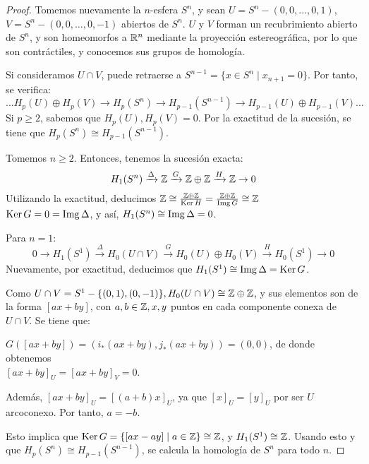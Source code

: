 \begin{proof}
  Tomemos nuevamente la $n$-esfera $S^n$, y sean $U = S^n - (0, 0, \dots, 0, 1)$, $V = S^n - (0, 0, \dots, 0, -1)$
  abiertos de $S^n$. $U$ y $V$ forman un recubrimiento abierto de $S^n$, y son homeomorfos a $\mathbb{R}^n$ mediante
  la proyección estereográfica, por lo que son contráctiles, y conocemos sus grupos de homología.

  Si consideramos $U \cap V$, puede retraerse a $S^{n-1} = \{x \in S^n \mid x_{n+1} = 0\}$. Por tanto, se verifica:
  \[ \dots H_p(U) \oplus H_p(V) \to H_p(S^n) \to H_{p-1}(S^{n-1}) \to H_{p-1}(U) \oplus H_{p-1}(V) \dots \]
  Si $p \geq 2$, sabemos que $H_p(U), H_p(V) = 0$. Por la exactitud de la sucesión, se tiene que $H_p(S^n) \cong H_{p-1}(S^{n-1})$.

  Tomemos $n \geq 2$. Entonces, tenemos la sucesión exacta:
  \[H_1(S^n) \xrightarrow{\Delta} \mathbb{Z} \xrightarrow{G} \mathbb{Z} \oplus \mathbb{Z} \xrightarrow{H} \mathbb{Z} \to 0\]
  Utilizando la exactitud, deducimos $\mathbb{Z} \cong \frac{\mathbb{Z} \oplus \mathbb{Z}}{\operatorname{Ker} H} = \frac{\mathbb{Z} \oplus \mathbb{Z}}{\operatorname{Img} G} \cong \mathbb{Z}$ \\
  $\operatorname{Ker} G = 0 = \operatorname{Img} \Delta$, y así, $H_1(S^n) \cong \operatorname{Img} \Delta = 0$.

  Para $n = 1$:
  \[ 0 \to H_1(S^1) \xrightarrow{\Delta} H_0(U \cap V) \xrightarrow{G} H_0(U) \oplus H_0(V) \xrightarrow{H} H_0(S^1) \to 0 \]
  Nuevamente, por exactitud, deducimos que $H_1(S^1) \cong \operatorname{Img} \Delta = \operatorname{Ker} G$.

  Como $U \cap V = S^1 - \{(0, 1), (0, -1)\}, H_0(U \cap V) \cong \mathbb{Z} \oplus \mathbb{Z}$, y sus elementos son de la forma
  $[ax + by]$, con $a,b \in \mathbb{Z}, x, y$ puntos en cada componente conexa de $U \cap V$. Se tiene que:

  $G([ax + by]) = (i_*(ax + by), j_*(ax + by)) = (0, 0)$, de donde obtenemos \\
  $[ax + by]_U = [ax + by]_V = 0$.

  Además, $[ax + by]_U = [(a+b) x]_U$, ya que $[x]_U = [y]_U$ por ser $U$ arcoconexo. Por tanto, $a = -b$.

  Esto implica que $\operatorname{Ker} G = \{[ax - ay] \mid a \in \mathbb{Z}\} \cong \mathbb{Z}$, y $H_1(S^1) \cong \mathbb{Z}$. Usando esto y que
  $H_p(S^n) \cong H_{p-1}(S^{n-1})$, se calcula la homología de $S^n$ para todo $n$.
\end{proof}
